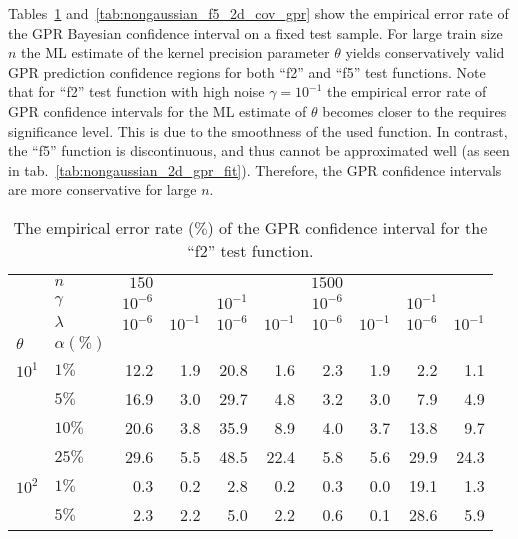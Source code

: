 \documentclass[a4paper,14pt]{extarticle}
\begin{document}
Tables~\ref{tab:nongaussian_f2_2d_cov_gpr} and~\ref{tab:nongaussian_f5_2d_cov_gpr}
show the empirical error rate of the GPR Bayesian confidence interval on a fixed
test sample. For large train size $n$ the ML estimate of the kernel precision parameter
$\theta$ yields conservatively valid GPR prediction confidence regions for both
``f2'' and ``f5'' test functions. Note that for ``f2'' test function with high noise
$\gamma=10^{-1}$ the empirical error rate of GPR confidence intervals for the ML
estimate of $\theta$ becomes closer to the requires significance level. This is
due to the smoothness of the used function. In contrast, the ``f5'' function is
discontinuous, and thus cannot be approximated well (as seen in tab.~\ref{tab:nongaussian_2d_gpr_fit}).
Therefore, the GPR confidence intervals are more conservative for large $n$.
\begin{table}
  \centering
  \caption{The empirical error rate ($\%$) of the GPR confidence interval for the
  ``f2'' test function.}
  \label{tab:nongaussian_f2_2d_cov_gpr}
  \begin{tabular}{ll||rrrr|rrrr}
  \toprule
       & $n$ & $150$ &          &           &          & $1500$ &          &           &          \\\cline{2-2}
       & $\gamma$ & $10^{-6}$ &          & $10^{-1}$ &          & $10^{-6}$ &          & $10^{-1}$ &          \\\cline{2-2}
       & $\lambda$ & $10^{-6}$ & $10^{-1}$ & $10^{-6}$ & $10^{-1}$ & $10^{-6}$ & $10^{-1}$ & $10^{-6}$ & $10^{-1}$ \\\cline{2-2}
  $\theta$ & $\alpha(\%)$ &          &          &          &          &          &          &          &          \\
  \midrule
   $10^1$ & $1\%$ &     12.2 &      1.9 &     20.8 &      1.6 &      2.3 &      1.9 &      2.2 &      1.1 \\
        & $5\%$ &     16.9 &      3.0 &     29.7 &      4.8 &      3.2 &      3.0 &      7.9 &      4.9 \\
        & $10\%$ &     20.6 &      3.8 &     35.9 &      8.9 &      4.0 &      3.7 &     13.8 &      9.7 \\
        & $25\%$ &     29.6 &      5.5 &     48.5 &     22.4 &      5.8 &      5.6 &     29.9 &     24.3 \\
  \midrule
   $10^2$ & $1\%$ &      0.3 &      0.2 &      2.8 &      0.2 &      0.3 &      0.0 &     19.1 &      1.3 \\
        & $5\%$ &      2.3 &      2.2 &      5.0 &      2.2 &      0.6 &      0.1 &     28.6 &      5.9 \\

\end{tabular}
\end{table}
\end{document}
